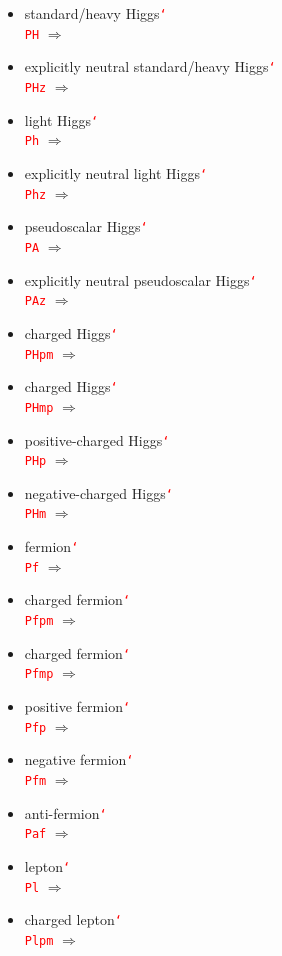 \documentclass[12pt]{article}
\newcommand{\texcmd}[1]{\textcolor{red}{\texttt{\char`\\#1}}}
\begin{document}
\begin{multicols}{2}
{\begin{itemize}
\item standard/heavy Higgs\newline \texcmd{PH} $\Rightarrow$ \PH
\item explicitly neutral standard/heavy Higgs\newline \texcmd{PHz} $\Rightarrow$ \PHz
\item light Higgs\newline \texcmd{Ph} $\Rightarrow$ \Ph
\item explicitly neutral light Higgs\newline \texcmd{Phz} $\Rightarrow$ \Phz
\item pseudoscalar Higgs\newline \texcmd{PA} $\Rightarrow$ \PA
\item explicitly neutral pseudoscalar Higgs\newline \texcmd{PAz} $\Rightarrow$ \PAz
\item charged Higgs\newline \texcmd{PHpm} $\Rightarrow$ \PHpm
\item charged Higgs\newline \texcmd{PHmp} $\Rightarrow$ \PHmp
\item positive-charged Higgs\newline \texcmd{PHp} $\Rightarrow$ \PHp
\item negative-charged Higgs\newline \texcmd{PHm} $\Rightarrow$ \PHm
\item fermion\newline \texcmd{Pf} $\Rightarrow$ \Pf
\item charged fermion\newline \texcmd{Pfpm} $\Rightarrow$ \Pfpm
\item charged fermion\newline \texcmd{Pfmp} $\Rightarrow$ \Pfmp
\item positive fermion\newline \texcmd{Pfp} $\Rightarrow$ \Pfp
\item negative fermion\newline \texcmd{Pfm} $\Rightarrow$ \Pfm
\item anti-fermion\newline \texcmd{Paf} $\Rightarrow$ \Paf
\item lepton\newline \texcmd{Pl} $\Rightarrow$ \Pl
\item charged lepton\newline \texcmd{Plpm} $\Rightarrow$ \Plpm

\end{itemize}}
\end{multicols}
\end{document}
